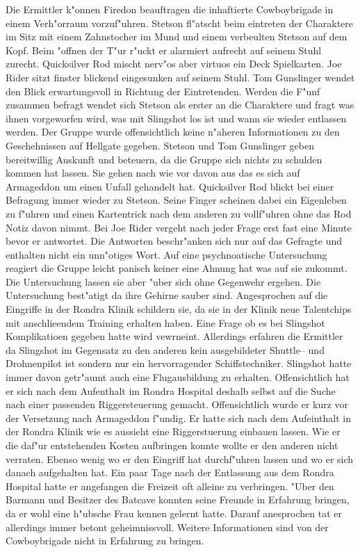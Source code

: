 Die Ermittler k"onnen Firedon beauftragen die inhaftierte Cowboybrigade in einem Verh"orraum vorzuf"uhren. Stetson fl"atscht beim eintreten der Charaktere im Sitz mit einem Zahnstocher im Mund und einem verbeulten Stetson auf dem Kopf. Beim "offnen der T"ur r"uckt er alarmiert aufrecht auf seinem Stuhl zurecht. Quicksilver Rod mischt nerv"os aber virtuos ein Deck Spielkarten. Joe Rider sitzt finster blickend eingesunken auf seinem Stuhl. Tom Gunslinger wendet den Blick erwartungsvoll in Richtung der Eintretenden. Werden die F"unf zusammen befragt wendet sich Stetson als erster an die Charaktere und fragt was ihnen vorgeworfen wird, was mit Slingshot los ist und wann sie wieder entlassen werden. Der Gruppe wurde offensichtlich keine n"aheren Informationen zu den Geschehnissen auf Hellgate gegeben. Stetson und Tom Gunslinger geben bereitwillig Auskunft und beteuern, da\3 die Gruppe sich nichts zu schulden kommen hat lassen. Sie gehen nach wie vor davon aus das es sich auf Armageddon um einen Unfall gehandelt hat. Quicksilver Rod blickt bei einer Befragung immer wieder zu Stetson. Seine Finger scheinen dabei ein Eigenleben zu f"uhren und einen Kartentrick nach dem anderen zu vollf"uhren ohne das Rod Notiz davon nimmt. Bei Joe Rider vergeht nach jeder Frage erst fast eine Minute bevor er antwortet. Die Antworten beschr"anken sich nur auf das Gefragte und enthalten nicht ein unn"otiges Wort. Auf eine psychnoatische Untersuchung reagiert die Gruppe leicht panisch keiner eine Ahnung hat was auf sie zukommt. Die Untersuchung lassen sie aber "uber sich ohne Gegenwehr ergehen. Die Untersuchung best"atigt da\3 ihre Gehirne sauber sind. Angesprochen auf die Eingriffe in der Rondra Klinik schildern sie, da\3 sie in der Klinik neue Talentchips mit anschlie\3endem Training erhalten haben. Eine Frage ob es bei Slingshot Komplikatioen gegeben hatte wird vewrneint. Allerdings erfahren die Ermittler da\3 Slingshot im Gegensatz zu den anderen kein ausgebildeter Shuttle-- und Drohnenpilot ist sondern nur ein hervorragender Schiffstechniker. Slingshot hatte immer davon getr"aumt auch eine Flugausbildung zu erhalten. Offensichtlich hat er sich nach dem Aufenthalt im Rondra Hospital deshalb selbst auf die Suche nach einer passenden Riggersteuerung gemacht. Offensichtlich wurde er kurz vor der Versetzung nach Armageddon f"undig. Er hatte sich nach dem Aufeinthalt in der Rondra Klinik wie es aussieht eine Riggerstuerung einbauen lassen. Wie er die daf"ur entstehenden Kosten aufbringen konnte wollte er den anderen nicht verraten. Ebenso wenig wo er den Eingriff hat durchf"uhren lassen und wo er sich danach aufgehalten hat. Ein paar Tage nach der Entlassung aus dem Rondra Hospital hatte er angefangen die Freizeit oft alleine zu verbringen. "Uber den Barmann und Besitzer des Batcave konnten seine Freunde in Erfahrung bringen, da\3 er wohl eine h"ubsche Frau kennen gelernt hatte. Darauf anesprochen tat er allerdings immer betont geheimnissvoll. Weitere Informationen sind von der Cowboybrigade  nicht in Erfahrung zu bringen.

